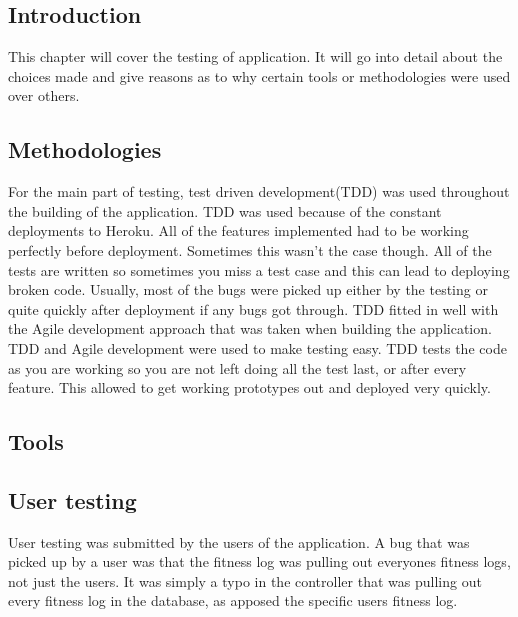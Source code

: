 \subsection{Introduction}
This chapter will cover the testing of application. It will go into detail about the choices made and give reasons as to why certain tools or methodologies were used over others.\\

\subsection{Methodologies}
For the main part of testing, test driven development(TDD) was used throughout the building of the application. TDD was used because of the constant deployments to Heroku. All of the features implemented had to be working perfectly before deployment. Sometimes this wasn't the case though. All of the tests are written so sometimes you miss a test case and this can lead to deploying broken code. Usually, most of the bugs were picked up either by the testing or quite quickly after deployment if any bugs got through. TDD fitted in well with the Agile development approach that was taken when building the application. TDD and Agile development were used to make testing easy. TDD tests the code as you are working so you are not left doing all the test last, or after every feature. This allowed to get working prototypes out and deployed very quickly.\\

\subsection{Tools}
\subsection{User testing}
User testing was submitted by the users of the application. 
A bug that was picked up by a user was that the fitness log was pulling out everyones fitness logs, not just the users. It was simply a typo in the controller that was pulling out every fitness log in the database, as apposed the specific users fitness log.